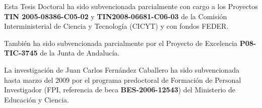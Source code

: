 \thispagestyle{empty}

\vspace*{2cm}

\begin{center}
Esta Tesis Doctoral ha sido subvencionada parcialmente con cargo a los Proyectos
\textbf{TIN 2005-08386-C05-02} y \textbf{TIN2008-06681-C06-03} de la Comisión
Interministerial de Ciencia y Tecnología (CICYT) y con fondos FEDER.\end{center}

\begin{center}
También ha sido subvencionada parcialmente por el Proyecto de Excelencia
\textbf{P08-TIC-3745} de la Junta de Andalucía.\end{center}
\begin{center}

La investigación de Juan Carlos Fernández Caballero ha sido subvencionada hasta
marzo del 2009 por el programa predoctoral de Formación de Personal Investigador (FPI,
referencia de beca \textbf{BES-2006-12543}) del Ministerio de Educación y
Ciencia.\end{center}

\begin{figure}[htb]
\centering
{}
\hspace{0.1\linewidth}
\end{figure}